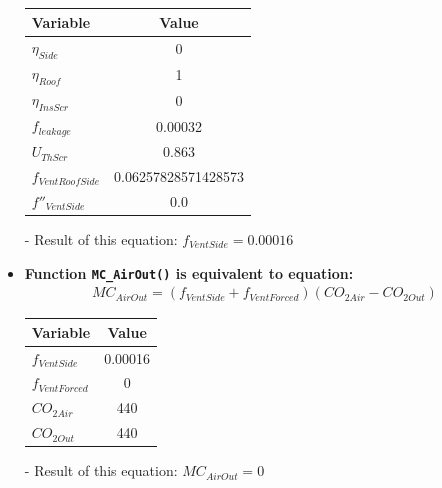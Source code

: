 \documentclass[a4paper]{article}
\numberwithin{equation}{section}
\begin{document}
\begin{itemize}
        \begin{table}[H]
          \centering
          \begin{tabular}{@{}lS[table-format=1.17]@{}}
            \toprule
            \textbf{Variable}    & \textbf{Value}      \\
            \midrule
            \(\eta_{Side}\)      & 0                   \\
            \(\eta_{Roof}\)      & 1                   \\
            \(\eta_{InsScr}\)    & 0                   \\
            \(f_{leakage}\)      & 0.00032             \\
            \(U_{ThScr}\)        & 0.863               \\
            \(f_{VentRoofSide}\) & 0.06257828571428573 \\
            \(f''_{VentSide}\)   & 0.0                 \\
            \bottomrule
          \end{tabular}
        \end{table}

  \item[-] Result of this equation: \(f_{VentSide} = 0.00016\)

  \item \textbf{Function \texttt{MC\_AirOut()} is equivalent to equation:}
        \begin{align*}
          MC_{AirOut} = (f_{VentSide} + f_{VentForced})(CO_{2 Air} - CO_{2 Out})
        \end{align*}

        \begin{table}[H]
          \centering
          \begin{tabular}{@{}lS@{}}
            \toprule
            \textbf{Variable}  & \textbf{Value} \\
            \midrule
            \(f_{VentSide}\)   & 0.00016        \\
            \(f_{VentForced}\) & 0              \\
            \(CO_{2 Air}\)     & 440            \\
            \(CO_{2 Out}\)     & 440            \\
            \bottomrule
          \end{tabular}
        \end{table}

  \item[-] Result of this equation: \( MC_{AirOut} = 0 \)


\end{itemize}
\end{document}
